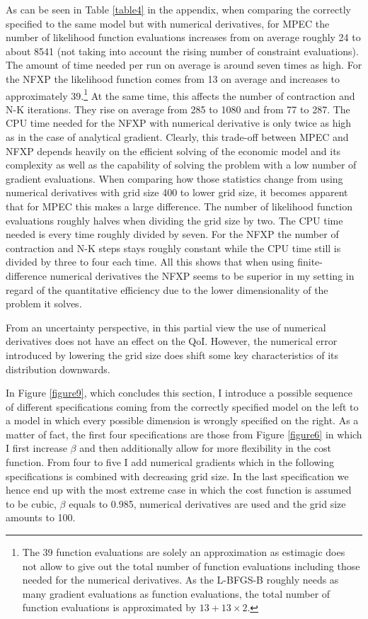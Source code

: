 As can be seen in Table \ref{table4} in the appendix, when comparing the correctly specified to the same model but with numerical derivatives, for MPEC the number of likelihood function evaluations increases from on average roughly 24 to about 8541 (not taking into account the rising number of constraint evaluations). The amount of time needed per run on average is around seven times as high. For the NFXP the likelihood function comes from 13 on average and increases to approximately 39.\footnote{ The 39 function evaluations are solely an approximation as estimagic does not allow to give out the total number of function evaluations including those needed for the numerical derivatives. As the L-BFGS-B roughly needs as many gradient evaluations as function evaluations, the total number of function evaluations is approximated by $13+13 \times 2$.} At the same time, this affects the number of contraction and N-K iterations. They rise on average from 285 to 1080 and from 77 to 287. The CPU time needed for the NFXP with numerical derivative is only twice as high as in the case of analytical gradient. Clearly, this trade-off between MPEC and NFXP depends heavily on the efficient solving of the economic model and its complexity as well as the capability of solving the problem with a low number of gradient evaluations. When comparing how those statistics change from using numerical derivatives with grid size 400 to lower grid size, it becomes apparent that for MPEC this makes a large difference. The number of likelihood function evaluations roughly halves when dividing the grid size by two. The CPU time needed is every time roughly divided by seven. For the NFXP the number of contraction and N-K steps stays roughly constant while the CPU time still is divided by three to four each time. All this shows that when using finite-difference numerical derivatives the NFXP seems to be superior in my setting in regard of the quantitative efficiency due to the lower dimensionality of the problem it solves.

From an uncertainty perspective, in this partial view the use of numerical derivatives does not have an effect on the QoI. However, the numerical error introduced by lowering the grid size does shift some key characteristics of its distribution downwards.

In Figure \ref{figure9}, which concludes this section, I introduce a possible sequence of different specifications coming from the correctly specified model on the left to a model in which every possible dimension is wrongly specified on the right. As a matter of fact, the first four specifications are those from Figure \ref{figure6} in which I first increase $\beta$ and then additionally allow for more flexibility in the cost function. From four to five I add numerical gradients which in the following specifications is combined with decreasing grid size. In the last specification we hence end up with the most extreme case in which the cost function is assumed to be cubic, $\beta$ equals to 0.985, numerical derivatives are used and the grid size amounts to 100.

